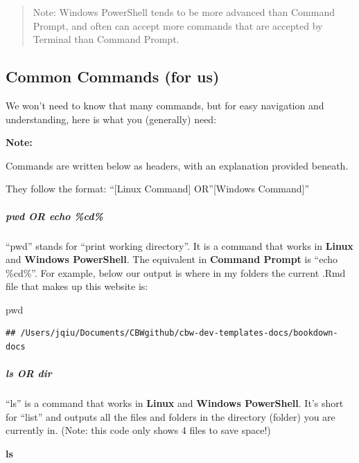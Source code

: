 \documentclass[
]{book}
\newenvironment{Shaded}{\begin{snugshade}}{\end{snugshade}}
\newcommand{\BuiltInTok}[1]{#1}
\newcommand{\FunctionTok}[1]{\textcolor[rgb]{0.13,0.29,0.53}{\textbf{#1}}}
\newenvironment{greenbox}{
  \definecolor{shadecolor}{RGB}{141, 181, 128}
  \color{white}
  \begin{shaded}}
 {\end{shaded}}
\theoremstyle{definition}
\theoremstyle{definition}
\theoremstyle{definition}
\theoremstyle{definition}
\theoremstyle{remark}
\begin{document}
\begin{quote}
Note: Windows PowerShell tends to be more advanced than Command Prompt, and often can accept more commands that are accepted by Terminal than Command Prompt.
\end{quote}

\subsection{Common Commands (for us)}\label{common-commands-for-us}

We won't need to know that many commands, but for easy navigation and understanding, here is what you (generally) need:

\begin{greenbox}
\textbf{Note:}

Commands are written below as headers, with an explanation provided beneath.

They follow the format: ``{[}Linux Command{]} OR''{[}Windows Command{]}''

\end{greenbox}

\subparagraph*{pwd OR echo \%cd\%}\label{pwd-or-echo-cd}

``pwd'' stands for ``print working directory''. It is a command that works in \textbf{Linux} and \textbf{Windows PowerShell}. The equivalent in \textbf{Command Prompt} is ``echo \%cd\%''. For example, below our output is where in my folders the current .Rmd file that makes up this website is:

\begin{Shaded}
\begin{Highlighting}[]
\BuiltInTok{pwd}
\end{Highlighting}
\end{Shaded}

\begin{verbatim}
## /Users/jqiu/Documents/CBWgithub/cbw-dev-templates-docs/bookdown-docs
\end{verbatim}

\subparagraph*{ls OR dir}\label{ls-or-dir}

``ls'' is a command that works in \textbf{Linux} and \textbf{Windows PowerShell}. It's short for ``list'' and outputs all the files and folders in the directory (folder) you are currently in. (Note: this code only shows 4 files to save space!)

\begin{Shaded}
\begin{Highlighting}[]
\FunctionTok{ls}
\end{Highlighting}
\end{Shaded}
\end{document}
